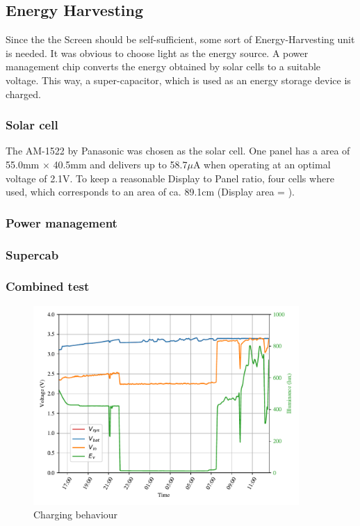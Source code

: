 \subsection{Energy Harvesting}
Since the the Screen should be self-sufficient, some sort of Energy-Harvesting unit is needed.
It was obvious to choose light as the energy source.
A power management chip converts the energy  obtained by solar cells to a suitable voltage.
This way, a super-capacitor, which is used as an energy storage device is charged.

\subsubsection{Solar cell}
The AM-1522 by Panasonic was chosen as the solar cell.
One panel has a area of 55.0mm $\times$ 40.5mm and delivers up to 58.7$\mu\text{A}$ when operating at an optimal voltage of 2.1V.
To keep a reasonable Display to Panel ratio, four cells where used, which corresponds to an area of ca. 89.1cm (Display area = ). 


\subsubsection{Power management}

\subsubsection{Supercab}

\subsubsection{Combined test}

\begin{figure}[h]
	\centering
	\includegraphics[width=0.9\textwidth]{4-development/hardware/graphics/laden.pdf}
	\caption{Charging behaviour\label{development:charge}}
\end{figure}

